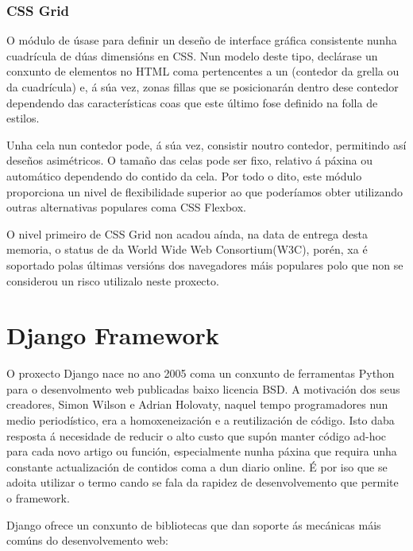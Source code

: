\subsubsection{CSS Grid}

O módulo de  úsase para definir un deseño de interface gráfica consistente nunha cuadrícula de dúas dimensións en CSS. Nun modelo deste tipo, declárase un conxunto de elementos no HTML coma pertencentes a un (contedor da grella ou da cuadrícula) e, á súa vez, zonas fillas que se posicionarán dentro dese contedor dependendo das características coas que este último fose definido na folla de estilos.

Unha cela nun contedor pode, á súa vez, consistir noutro contedor, permitindo así deseños asimétricos. O tamaño das celas pode ser fixo, relativo á páxina ou automático dependendo do contido da cela. Por todo o dito, este módulo proporciona un nivel de flexibilidade superior ao que poderíamos obter utilizando outras alternativas populares coma CSS Flexbox. 

O nivel primeiro de CSS Grid non acadou aínda, na data de entrega desta memoria, o status de  da  World Wide Web Consortium(W3C)\cite{css_grid_w3c}, porén, xa é soportado polas últimas versións dos navegadores máis populares\cite{css_grid_w3c2} polo que non se considerou un risco utilizalo neste proxecto.


\section{Django Framework}

O proxecto Django nace no ano 2005 coma un conxunto de ferramentas Python para o desenvolmento web publicadas
baixo licencia BSD. A motivación dos seus creadores, Simon Wilson e Adrian Holovaty, naquel tempo programadores
nun medio periodístico, era a homoxeneización e a reutilización de código. Isto daba resposta á necesidade de reducir
o alto custo que supón manter código ad-hoc para cada novo artigo ou función, especialmente nunha páxina que
requira unha constante actualización de contidos coma a dun diario online. É por iso que se adoita utilizar o 
termo  cando se fala da rapidez de desenvolvemento que permite o framework\cite{django1}.  

Django ofrece un conxunto de bibliotecas que dan soporte ás mecánicas máis comúns do desenvolvemento
web:


